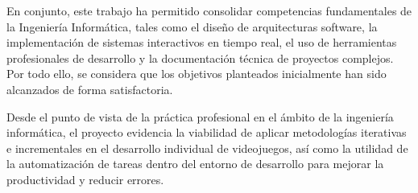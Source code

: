 En conjunto, este trabajo ha permitido consolidar competencias fundamentales de la Ingeniería Informática, tales como el diseño de arquitecturas software, la implementación de sistemas interactivos en tiempo real, el uso de herramientas profesionales de desarrollo y la documentación técnica de proyectos complejos. Por todo ello, se considera que los objetivos planteados inicialmente han sido alcanzados de forma satisfactoria.

Desde el punto de vista de la práctica profesional en el ámbito de la ingeniería informática, el proyecto evidencia la viabilidad de aplicar metodologías iterativas e incrementales en el desarrollo individual de videojuegos, así como la utilidad de la automatización de tareas dentro del entorno de desarrollo para mejorar la productividad y reducir errores.

